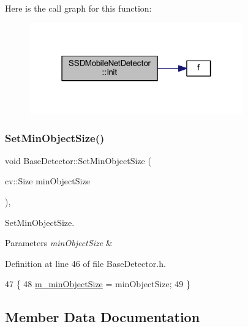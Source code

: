 Here is the call graph for this function\+:\nopagebreak
\begin{figure}[H]
\begin{center}
\leavevmode
\includegraphics[width=262pt]{class_s_s_d_mobile_net_detector_a2830cbf9b82b159c25fb2796b867eaef_cgraph}
\end{center}
\end{figure}
\mbox{\label{class_base_detector_ab459f4e77cf1110cc1ee84027f0f2a03}} 
\subsubsection{\texorpdfstring{Set\+Min\+Object\+Size()}{SetMinObjectSize()}}
{\footnotesize\ttfamily void Base\+Detector\+::\+Set\+Min\+Object\+Size (\begin{DoxyParamCaption}\item[{cv\+::\+Size}]{min\+Object\+Size }\end{DoxyParamCaption})\hspace{0.3cm}{\ttfamily [inline]}, {\ttfamily [inherited]}}



Set\+Min\+Object\+Size. 


\begin{DoxyParams}{Parameters}
{\em min\+Object\+Size} & \\
\hline
\end{DoxyParams}


Definition at line 46 of file Base\+Detector.\+h.


\begin{DoxyCode}
47     \{
48         \mbox{\hyperlink{class_base_detector_a651b938c89c94daac4763728637d90c9}{m\_minObjectSize}} = minObjectSize;
49     \}
\end{DoxyCode}


\subsection{Member Data Documentation}
\mbox{\label{class_s_s_d_mobile_net_detector_afc45ce0049d048598325eda63f10056f}} 
